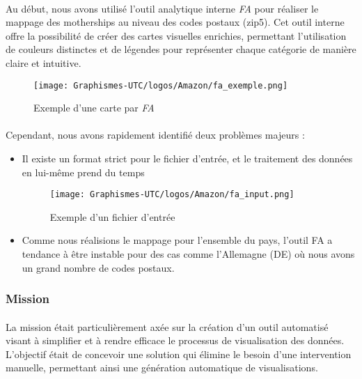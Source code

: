 \paragraph{}
\vspace{-2em}
Au début, nous avons utilisé l'outil analytique interne \textit{FA} pour réaliser le mappage des motherships au niveau des codes postaux (zip5). Cet outil interne offre la possibilité de créer des cartes visuelles enrichies, permettant l'utilisation de couleurs distinctes et de légendes pour représenter chaque catégorie de manière claire et intuitive.

\begin{figure}[H]
  \centering
  \texttt{[image: Graphismes-UTC/logos/Amazon/fa\_exemple.png]}
  \caption{Exemple d'une carte par \textit{FA}}
\end{figure}

\paragraph{}
\vspace{-2em}
Cependant, nous avons rapidement identifié deux problèmes majeurs :
\begin{itemize}
    \item Il existe un format strict pour le fichier d'entrée, et le traitement des données en lui-même prend du temps
    \begin{figure}[H]
    \centering
    \texttt{[image: Graphismes-UTC/logos/Amazon/fa\_input.png]}
    \caption{Exemple d'un fichier d'entrée}
    \end{figure}

    \item Comme nous réalisions le mappage pour l'ensemble du pays, l'outil FA a tendance à être instable pour des cas comme l'Allemagne (DE) où nous avons un grand nombre de codes postaux.
\end{itemize}

\subsubsection{Mission}
\paragraph{}
\vspace{-2em}
La mission était particulièrement axée sur la création d'un outil automatisé visant à simplifier et à rendre efficace le processus de visualisation des données. L'objectif était de concevoir une solution qui élimine le besoin d'une intervention manuelle, permettant ainsi une génération automatique de visualisations. 

